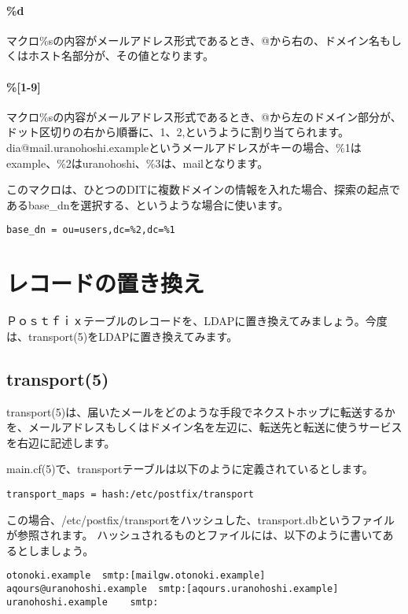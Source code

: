 \paragraph{\%d}
マクロ\%sの内容がメールアドレス形式であるとき、@から右の、ドメイン名もしくはホスト名部分が、その値となります。

\paragraph{\%[1-9]}
マクロ\%sの内容がメールアドレス形式であるとき、@から左のドメイン部分が、ドット区切りの右から順番に、1、2,というように割り当てられます。dia@mail.uranohoshi.exampleというメールアドレスがキーの場合、\%1はexample、\%2はuranohoshi、\%3は、mailとなります。

このマクロは、ひとつのDITに複数ドメインの情報を入れた場合、探索の起点であるbase\_dnを選択する、というような場合に使います。

\begin{verbatim}
base_dn = ou=users,dc=%2,dc=%1
\end{verbatim}

\section{レコードの置き換え}
Ｐｏｓｔｆｉｘテーブルのレコードを、LDAPに置き換えてみましょう。今度は、transport(5)をLDAPに置き換えてみます。

\subsection{transport(5)}

transport(5)は、届いたメールをどのような手段でネクストホップに転送するかを、メールアドレスもしくはドメイン名を左辺に、転送先と転送に使うサービスを右辺に記述します。

main.cf(5)で、transportテーブルは以下のように定義されているとします。

\begin{verbatim}
transport_maps = hash:/etc/postfix/transport
\end{verbatim}

この場合、/etc/postfix/transportをハッシュした、transport.dbというファイルが参照されます。
ハッシュされるものとファイルには、以下のように書いてあるとしましょう。

\begin{verbatim}
otonoki.example  smtp:[mailgw.otonoki.example]
aqours@uranohoshi.example  smtp:[aqours.uranohoshi.example]
uranohoshi.example    smtp:
\end{verbatim}

